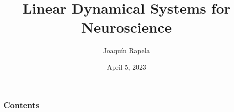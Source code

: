 \newtheorem{claim}{Claim}

\newenvironment{rowvector}
 {\bm{[}\begin{matrix}}
 {\end{matrix}\bm{]}}



\title[LDS for Neuro]{Linear Dynamical Systems for Neuroscience} %

\author{Joaqu\'{i}n Rapela} %
\date{April 5, 2023} %




\begin{frame}
\titlepage %
\end{frame}

\begin{frame}
\frametitle{Contents} %
\tableofcontents %
\end{frame}


